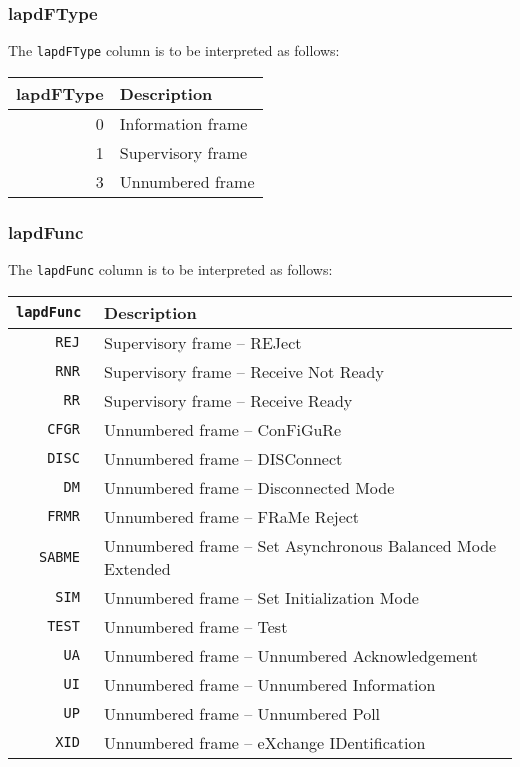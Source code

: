\documentclass[documentation]{subfiles}
\begin{document}
\subsubsection{lapdFType}\label{lapdFType}
The {\tt lapdFType} column is to be interpreted as follows:
\begin{longtable}{rl}
    \toprule
    {\bf lapdFType} & {\bf Description}\\
    \midrule\endhead%
    0               & Information frame\\
    1               & Supervisory frame\\
    3               & Unnumbered frame\\
    \bottomrule
\end{longtable}

\subsubsection{lapdFunc}\label{lapdFunc}
The {\tt lapdFunc} column is to be interpreted as follows:
\begin{longtable}{>{\tt}rl}
    \toprule
    {\bf lapdFunc} & {\bf Description}\\
    \midrule\endhead%
    REJ            & Supervisory frame -- REJect\\
    RNR            & Supervisory frame -- Receive Not Ready\\
    RR             & Supervisory frame -- Receive Ready\\
    CFGR           & Unnumbered frame -- ConFiGuRe\\
    DISC           & Unnumbered frame -- DISConnect\\
    DM             & Unnumbered frame -- Disconnected Mode\\
    FRMR           & Unnumbered frame -- FRaMe Reject\\
    SABME          & Unnumbered frame -- Set Asynchronous Balanced Mode Extended\\
    SIM            & Unnumbered frame -- Set Initialization Mode\\
    TEST           & Unnumbered frame -- Test\\
    UA             & Unnumbered frame -- Unnumbered Acknowledgement\\
    UI             & Unnumbered frame -- Unnumbered Information\\
    UP             & Unnumbered frame -- Unnumbered Poll\\
    XID            & Unnumbered frame -- eXchange IDentification\\
    \bottomrule
\end{longtable}
\end{document}
